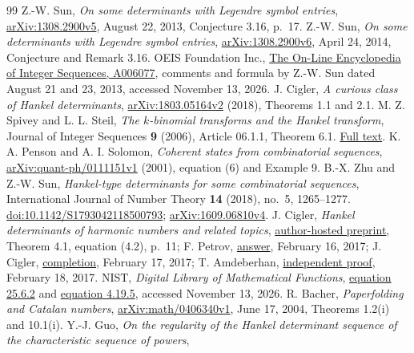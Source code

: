 \documentclass[11pt]{article}
\begin{document}
\small
\begin{thebibliography}{99}
 Z.-W. Sun,
\emph{On some determinants with Legendre symbol entries},
\href{https://arxiv.org/abs/1308.2900v5}{arXiv:1308.2900v5}, August 22, 2013,
Conjecture 3.16, p.~17.
 Z.-W. Sun,
\emph{On some determinants with Legendre symbol entries},
\href{https://arxiv.org/abs/1308.2900v6}{arXiv:1308.2900v6},
April 24, 2014, Conjecture and Remark 3.16.
 OEIS Foundation Inc.,
\href{https://oeis.org/A006077}{The On-Line Encyclopedia of Integer Sequences,
A006077}, comments and formula by Z.-W. Sun dated August 21 and 23, 2013,
accessed November 13, 2026.
 J. Cigler,
\emph{A curious class of Hankel determinants},
\href{https://arxiv.org/abs/1803.05164v2}{arXiv:1803.05164v2} (2018),
Theorems 1.1 and 2.1.
 M. Z. Spivey and L. L. Steil,
\emph{The $k$-binomial transforms and the Hankel transform},
Journal of Integer Sequences \textbf{9} (2006), Article 06.1.1, Theorem 6.1.
\href{https://cs.uwaterloo.ca/journals/JIS/VOL9/Spivey/spivey7.html}{Full text}.
 K. A. Penson and A. I. Solomon,
\emph{Coherent states from combinatorial sequences},
\href{https://arxiv.org/abs/quant-ph/0111151v1}{arXiv:quant-ph/0111151v1}
(2001), equation (6) and Example 9.
 B.-X. Zhu and Z.-W. Sun,
\emph{Hankel-type determinants for some combinatorial sequences},
International Journal of Number Theory \textbf{14} (2018), no.~5, 1265--1277.
\href{https://doi.org/10.1142/S1793042118500793}{doi:10.1142/S1793042118500793};
\href{https://arxiv.org/abs/1609.06810v4}{arXiv:1609.06810v4}.
 J. Cigler,
\emph{Hankel determinants of harmonic numbers and related topics},
\href{https://homepage.univie.ac.at/johann.cigler/preprints/harmonic.pdf}{author-hosted preprint},
Theorem 4.1, equation (4.2), p.~11;
F. Petrov, \href{https://mathoverflow.net/a/262422}{answer}, February 16, 2017;
J. Cigler, \href{https://mathoverflow.net/a/262469}{completion}, February 17, 2017;
T. Amdeberhan, \href{https://mathoverflow.net/a/262576}{independent proof}, February 18, 2017.
 NIST,
\emph{Digital Library of Mathematical Functions},
\href{https://dlmf.nist.gov/25.6.E2}{equation 25.6.2} and
\href{https://dlmf.nist.gov/4.19.E5}{equation 4.19.5},
accessed November 13, 2026.
 R. Bacher,
\emph{Paperfolding and Catalan numbers},
\href{https://arxiv.org/abs/math/0406340v1}{arXiv:math/0406340v1},
June 17, 2004, Theorems 1.2(i) and 10.1(i).
 Y.-J. Guo,
\emph{On the regularity of the Hankel determinant sequence of the characteristic sequence of powers},

\end{thebibliography}
\end{document}
